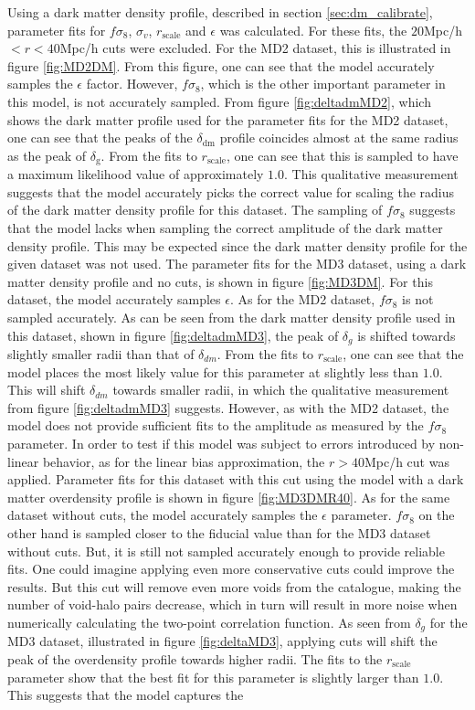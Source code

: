 Using a dark matter density profile, described in section \ref{sec:dm_calibrate}, parameter fits for $f\sigma_8$, $\sigma_v$, $r_\mathrm{scale}$ and $\epsilon$ was calculated. For these fits, the $20$Mpc/h$<r<40$Mpc/h cuts were excluded. For the MD2 dataset, this is illustrated in figure \ref{fig:MD2DM}. From this figure, one can see that the model accurately samples the $\epsilon$ factor. However, $f\sigma_8$, which is the other important parameter in this model, is not accurately sampled. From figure \ref{fig:deltadmMD2}, which shows the dark matter profile used for the parameter fits for the MD2 dataset, one can see that the peaks of the $\delta_{\mathrm{dm}}$ profile coincides almost at the same radius as the peak of $\delta_\mathrm{g}$. From the fits to $r_\mathrm{scale}$, one can see that this is sampled to have a maximum likelihood value of approximately $1.0$. This qualitative measurement suggests that the model accurately picks the correct value for scaling the radius of the dark matter density profile for this dataset. The sampling of $f\sigma_8$ suggests that the model lacks when sampling the correct amplitude of the dark matter density profile. This may be expected since the dark matter density profile for the given dataset was not used. The parameter fits for the MD3 dataset, using a dark matter density profile and no cuts, is shown in figure \ref{fig:MD3DM}. For this dataset, the model accurately samples $\epsilon$. As for the MD2 dataset, $f\sigma_8$ is not sampled accurately. As can be seen from the dark matter density profile used in this dataset, shown in figure \ref{fig:deltadmMD3}, the peak of $\delta_g$ is shifted towards slightly smaller radii than that of $\delta_{dm}$. From the fits to $r_{\mathrm{scale}}$, one can see that the model places the most likely value for this parameter at slightly less than $1.0$. This will shift $\delta_{dm}$ towards smaller radii, in which the qualitative measurement from figure \ref{fig:deltadmMD3} suggests. However, as with the MD2 dataset, the model does not provide sufficient fits to the amplitude as measured by the $f\sigma_8$ parameter. In order to test if this model was subject to errors introduced by non-linear behavior, as for the linear bias approximation, the $r>40$Mpc/h cut was applied. Parameter fits for this dataset with this cut using the model with a dark matter overdensity profile is shown in figure \ref{fig:MD3DMR40}. As for the same dataset without cuts, the model accurately samples the $\epsilon$ parameter. $f\sigma_8$ on the other hand is sampled closer to the fiducial value than for the MD3 dataset without cuts. But, it is still not sampled accurately enough to provide reliable fits. One could imagine applying even more conservative cuts could improve the results. But this cut will remove even more voids from the catalogue, making the number of void-halo pairs decrease, which in turn will result in more noise when numerically calculating the two-point correlation function. As seen from $\delta_g$ for the MD3 dataset, illustrated in figure \ref{fig:deltaMD3}, applying cuts will shift the peak of the overdensity profile towards higher radii. The fits to the $r_{\mathrm{scale}}$ parameter show that the best fit for this parameter is slightly larger than $1.0$. This suggests that the model captures the 